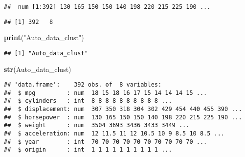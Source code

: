 \documentclass[11pt,]{article}
\newenvironment{Shaded}{\begin{snugshade}}{\end{snugshade}}
\newcommand{\CommentTok}[1]{\textcolor[rgb]{0.56,0.35,0.01}{\textit{#1}}}
\newcommand{\DecValTok}[1]{\textcolor[rgb]{0.00,0.00,0.81}{#1}}
\newcommand{\KeywordTok}[1]{\textcolor[rgb]{0.13,0.29,0.53}{\textbf{#1}}}
\newcommand{\NormalTok}[1]{#1}
\newcommand{\OperatorTok}[1]{\textcolor[rgb]{0.81,0.36,0.00}{\textbf{#1}}}
\newcommand{\StringTok}[1]{\textcolor[rgb]{0.31,0.60,0.02}{#1}}
\begin{document}
\begin{Shaded}
\end{Shaded}

\begin{verbatim}
##  num [1:392] 130 165 150 150 140 198 220 215 225 190 ...
\end{verbatim}

\begin{Shaded}
\end{Shaded}

\begin{verbatim}
## [1] 392   8
\end{verbatim}

\begin{Shaded}
\begin{Highlighting}[]
\KeywordTok{print}\NormalTok{(}\StringTok{"Auto_data_clust"}\NormalTok{)}
\end{Highlighting}
\end{Shaded}

\begin{verbatim}
## [1] "Auto_data_clust"
\end{verbatim}

\begin{Shaded}
\begin{Highlighting}[]
\KeywordTok{str}\NormalTok{(Auto_data_clust)}
\end{Highlighting}
\end{Shaded}

\begin{verbatim}
## 'data.frame':    392 obs. of  8 variables:
##  $ mpg         : num  18 15 18 16 17 15 14 14 14 15 ...
##  $ cylinders   : int  8 8 8 8 8 8 8 8 8 8 ...
##  $ displacement: num  307 350 318 304 302 429 454 440 455 390 ...
##  $ horsepower  : num  130 165 150 150 140 198 220 215 225 190 ...
##  $ weight      : num  3504 3693 3436 3433 3449 ...
##  $ acceleration: num  12 11.5 11 12 10.5 10 9 8.5 10 8.5 ...
##  $ year        : int  70 70 70 70 70 70 70 70 70 70 ...
##  $ origin      : int  1 1 1 1 1 1 1 1 1 1 ...
\end{verbatim}
\end{document}
